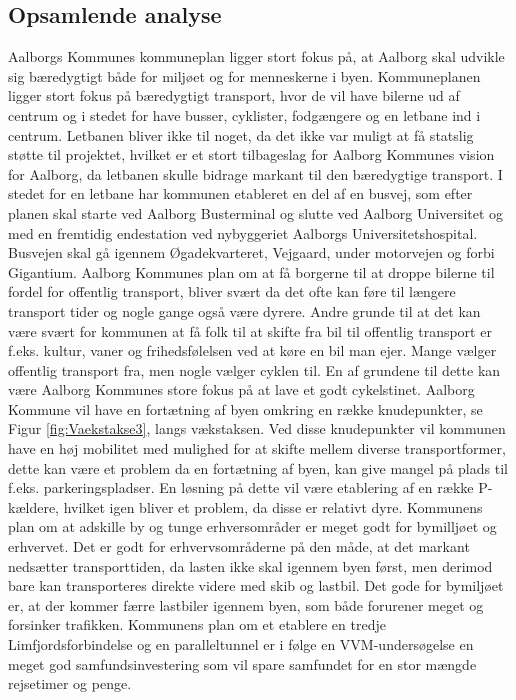\subsection{Opsamlende analyse}
Aalborgs Kommunes kommuneplan ligger stort fokus på, at Aalborg skal udvikle sig bæredygtigt både for miljøet og for menneskerne i byen. Kommuneplanen ligger stort fokus på bæredygtigt transport, hvor de vil have bilerne ud af centrum og i stedet for have busser, cyklister, fodgængere og en letbane ind i centrum. Letbanen bliver ikke til noget, da det ikke var muligt at få statslig støtte til projektet, hvilket er et stort tilbageslag for Aalborg Kommunes vision for Aalborg, da letbanen skulle bidrage markant til den bæredygtige transport. I stedet for en letbane har kommunen etableret en del af en busvej, som efter planen skal starte ved Aalborg Busterminal og slutte ved Aalborg Universitet og med en fremtidig endestation ved nybyggeriet Aalborgs Universitetshospital. Busvejen skal gå igennem Øgadekvarteret, Vejgaard, under motorvejen og forbi Gigantium. Aalborg Kommunes plan om at få borgerne til at droppe bilerne til fordel for offentlig transport, bliver svært da det ofte kan føre til længere transport tider og nogle gange også være dyrere. Andre grunde til at det kan være svært for kommunen at få folk til at skifte fra bil til offentlig transport er f.eks. kultur, vaner og frihedsfølelsen ved at køre en bil man ejer. Mange vælger offentlig transport fra, men nogle vælger cyklen til. En af grundene til dette kan være Aalborg Kommunes store fokus på at lave et godt cykelstinet. Aalborg Kommune vil have en fortætning af byen omkring en række knudepunkter, se Figur \ref{fig:Vaekstakse3}, langs vækstaksen. Ved disse knudepunkter vil kommunen have en høj mobilitet med mulighed for at skifte mellem diverse transportformer, dette kan være et problem da en fortætning af byen, kan give mangel på plads til f.eks. parkeringspladser. En løsning på dette vil være etablering af en række P-kældere, hvilket igen bliver et problem, da disse er relativt dyre. Kommunens plan om at adskille by og tunge erhversområder er meget godt for bymilljøet og erhvervet. Det er godt for erhvervsområderne på den måde, at det markant nedsætter transporttiden, da lasten ikke skal igennem byen først, men derimod bare kan transporteres direkte videre med skib og lastbil. Det gode for bymiljøet er, at der kommer færre lastbiler igennem byen, som både forurener meget og forsinker trafikken. Kommunens plan om et etablere en tredje Limfjordsforbindelse og en paralleltunnel er i følge en VVM-undersøgelse en meget god samfundsinvestering som vil spare samfundet for en stor mængde rejsetimer og penge.

